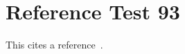 \documentclass{article}
\begin{document}
\section{Reference Test 93}
This cites a reference~\cite{test93}.

\end{document}
